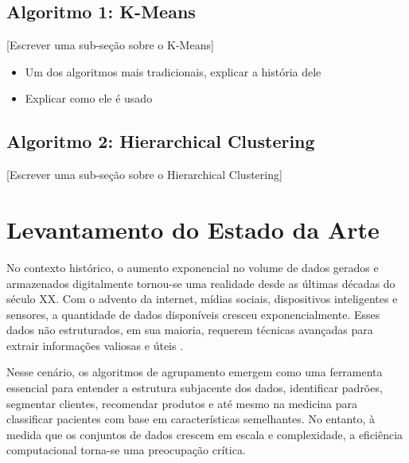 \documentclass[12pt, %
openright, 
oneside, %
a4paper,    %
brazil]{facom-ufu-abntex2}
\begin{document}

\section{Algoritmo 1: K-Means}

[Escrever uma sub-seção sobre o K-Means]

\begin{itemize}  
  \item Um dos algoritmos mais tradicionais, explicar a história dele
  \item Explicar como ele é usado
\end{itemize}




\section{Algoritmo 2: Hierarchical Clustering}

[Escrever uma sub-seção sobre o Hierarchical Clustering]





\chapter{Levantamento do Estado da Arte}

No contexto histórico, o aumento exponencial no volume de dados gerados e armazenados digitalmente tornou-se uma realidade desde as últimas décadas do século XX. Com o advento da internet, mídias sociais, dispositivos inteligentes e sensores, a quantidade de dados disponíveis cresceu exponencialmente. Esses dados não estruturados, em sua maioria, requerem técnicas avançadas para extrair informações valiosas e úteis \cite{dataMining2012-preface}.

Nesse cenário, os algoritmos de agrupamento emergem como uma ferramenta essencial para entender a estrutura subjacente dos dados, identificar padrões, segmentar clientes, recomendar produtos e até mesmo na medicina para classificar pacientes com base em características semelhantes. No entanto, à medida que os conjuntos de dados crescem em escala e complexidade, a eficiência computacional torna-se uma preocupação crítica.
\end{document}
